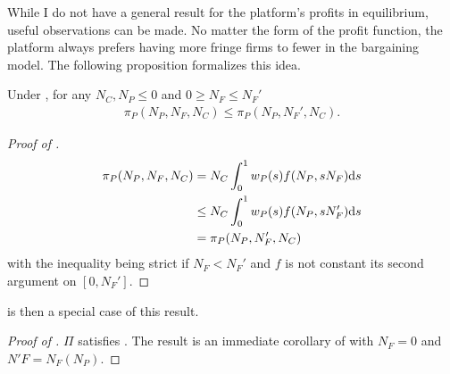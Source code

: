 While I do not have a general result for the platform's profits in equilibrium, useful observations can be made.
No matter the form of the profit function, the platform always prefers having more fringe firms to fewer in the bargaining model.
The following proposition formalizes this idea.
\begin{proposition}
    \label{prop:hybrid_vs_retail_general}
    Under , for any $N_C, N_P\leq 0$ and $0 \geq N_F \leq N_F'$
    \begin{align*}
        \pi_P(N_P, N_F, N_C) \leq \pi_P(N_P, N_F', N_C).
    \end{align*}
\end{proposition}
\begin{proof}[Proof of ]
    \begin{align*}
        \pi_P(N_P, N_F, N_C) &= N_C \int_0^1 w_P(s) f(N_P, s N_F) \mathrm{d}s \\
        &\leq  N_C \int_0^1 w_P(s) f(N_P, s N_F') \mathrm{d}s \\
        &= \pi_P(N_P, N_F', N_C)
    \end{align*}
    with the inequality being strict if $N_F < N_F'$ and $f$ is not constant its second argument on $[0, N_F']$.
\end{proof}

 is then a special case of this result.
\begin{proof}[Proof of ]
    $\Pi$ satisfies .
    The result is an immediate corollary of  with $N_F=0$ and $N'F=N_F(N_P)$.
\end{proof}

